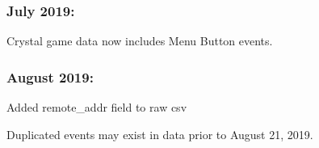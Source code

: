 \subsubsection*{July 2019\+:}


\begin{DoxyItemize}
\item Crystal game data now includes Menu Button events. \subsubsection*{August 2019\+:}
\end{DoxyItemize}


\begin{DoxyItemize}
\item Added remote\+\_\+addr field to raw csv
\item Duplicated events may exist in data prior to August 21, 2019. 
\end{DoxyItemize}